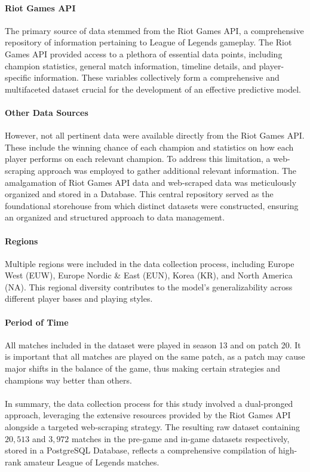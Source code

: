 \documentclass[12pt, a4paper, headinclude, twoside, plainheadsepline, open=right, numbers=noenddot, hidelinks, toc=listof, toc=bibliography]{scrreprt}
\begin{document}
\paragraph{Riot Games API}
The primary source of data stemmed from the Riot Games API, a comprehensive repository of information pertaining to League of Legends gameplay.
The Riot Games API provided access to a plethora of essential data points, including champion statistics, general match information, timeline details, and player-specific information.
These variables collectively form a comprehensive and multifaceted dataset crucial for the development of an effective predictive model.
\paragraph{Other Data Sources}
However, not all pertinent data were available directly from the Riot Games API.
These include the winning chance of each champion and statistics on how each player performs on each relevant champion.
To address this limitation, a web-scraping approach was employed to gather additional relevant information. The amalgamation of Riot Games API data and web-scraped data was meticulously organized and stored in a Database.
This central repository served as the foundational storehouse from which distinct datasets were constructed, ensuring an organized and structured approach to data management.
\paragraph{Regions}
Multiple regions were included in the data collection process, including Europe West (EUW), Europe Nordic \& East (EUN), Korea (KR), and North America (NA).
This regional diversity contributes to the model's generalizability across different player bases and playing styles.
\paragraph{Period of Time}
All matches included in the dataset were played in season 13 and on patch 20.
It is important that all matches are played on the same patch, as a patch may cause major shifts in the balance of the game, thus making certain strategies and champions way better than others.
\\ \  \\
In summary, the data collection process for this study involved a dual-pronged approach, leveraging the extensive resources provided by the Riot Games API alongside a targeted web-scraping strategy.
The resulting raw dataset containing $20,513$ and  $3,972$ matches in the pre-game and in-game datasets respectively, stored in a PostgreSQL Database, reflects a comprehensive compilation of high-rank amateur League of Legends matches.
\end{document}
